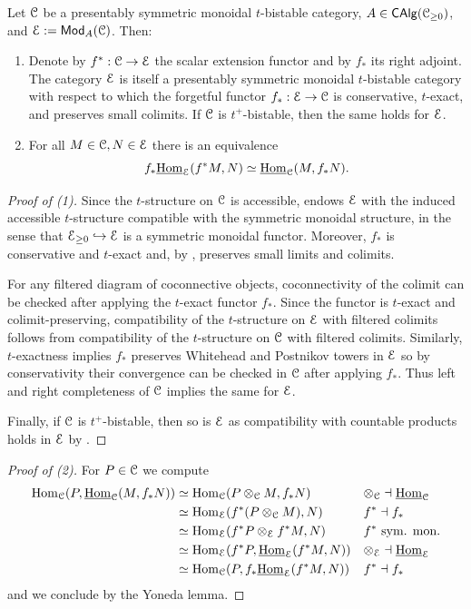 \begin{lemma}\label{lem: modules inherit bistability}
    Let $\EuScript{C}$ be a presentably symmetric monoidal $t$-bistable category, $A\in\mathsf{CAlg}(\EuScript{C}_{\geq0})$, and $\EuScript{E}:=\mathsf{Mod}_{A}(\EuScript{C})$. Then:
    \begin{enumerate}
        \item Denote by $f^{*}:\EuScript{C}\to\EuScript{E}$ the scalar extension functor and by $f_{*}$ its right adjoint. The category $\EuScript{E}$ is itself a presentably symmetric monoidal $t$-bistable category with respect to which the forgetful functor $f_{*}:\EuScript{E}\to\EuScript{C}$ is conservative, $t$-exact, and preserves small colimits. If $\EuScript{C}$ is $t^{+}$-bistable, then the same holds for $\EuScript{E}$. 
        \item For all $M\in\EuScript{C},N\in\EuScript{E}$ there is an equivalence 
        $$f_{*}\underline{\mathrm{Hom}}_{\EuScript{E}}(f^{*}M,N)\simeq\underline{\mathrm{Hom}}_{\EuScript{C}}(M, f_{*}N).$$
    \end{enumerate}
\end{lemma}
\begin{proof}[Proof of (1)]
    Since the $t$-structure on $\EuScript{C}$ is accessible, \cite[Prop. A.15]{CartierModules} endows $\EuScript{E}$ with the induced accessible $t$-structure compatible with the symmetric monoidal structure, in the sense that $\EuScript{E}_{\geq0}\hookrightarrow\EuScript{E}$ is a symmetric monoidal functor. Moreover, $f_{*}$ is conservative \cite[Prop. 4.8.5.8 (5)]{HA} and $t$-exact and, by \cite[Cor. 4.2.3.7]{HA}, preserves small limits and colimits. 

    For any filtered diagram of coconnective objects, coconnectivity of the colimit can be checked after applying the $t$-exact functor $f_{*}$. Since the functor is $t$-exact and colimit-preserving, compatibility of the $t$-structure on $\EuScript{E}$ with filtered colimits follows from compatibility of the $t$-structure on $\EuScript{C}$ with filtered colimits. Similarly, $t$-exactness implies $f_{*}$ preserves Whitehead and Postnikov towers in $\EuScript{E}$ so by conservativity their convergence can be checked in $\EuScript{C}$ after applying $f_{*}$. Thus left and right completeness of $\EuScript{C}$ implies the same for $\EuScript{E}$. 

    Finally, if $\EuScript{C}$ is $t^{+}$-bistable, then so is $\EuScript{E}$ as compatibility with countable products holds in $\EuScript{E}$ by \cite[Prop. A.15 (2)]{CartierModules}. 
\end{proof}
\begin{proof}[Proof of (2)]
    For $P\in\EuScript{C}$ we compute 
    \begin{align*}
        \mathrm{Hom}_{\EuScript{C}}(P, \underline{\mathrm{Hom}}_{\EuScript{C}}(M, f_{*}N)) &\simeq \mathrm{Hom}_{\EuScript{C}}(P\otimes_{\EuScript{C}}M,f_{*}N) && \otimes_{\EuScript{C}}\dashv\underline{\mathrm{Hom}}_{\EuScript{C}} \\
        &\simeq \mathrm{Hom}_{\EuScript{E}}(f^{*}(P\otimes_{\EuScript{C}}M),N) && f^{*}\dashv f_{*} \\
        &\simeq \mathrm{Hom}_{\EuScript{E}}(f^{*}P\otimes_{\EuScript{E}}f^{*}M,N) && f^{*}\text{ sym. mon.} \\
        &\simeq \mathrm{Hom}_{\EuScript{E}}(f^{*}P,\underline{\mathrm{Hom}}_{\EuScript{E}}(f^{*}M,N)) && \otimes_{\EuScript{E}}\dashv \underline{\mathrm{Hom}}_{\EuScript{E}} \\
        &\simeq \mathrm{Hom}_{\EuScript{C}}(P, f_{*}\underline{\mathrm{Hom}}_{\EuScript{E}}(f^{*}M, N)) && f^{*}\dashv f_{*}
    \end{align*}
    and we conclude by the Yoneda lemma. 
\end{proof}
